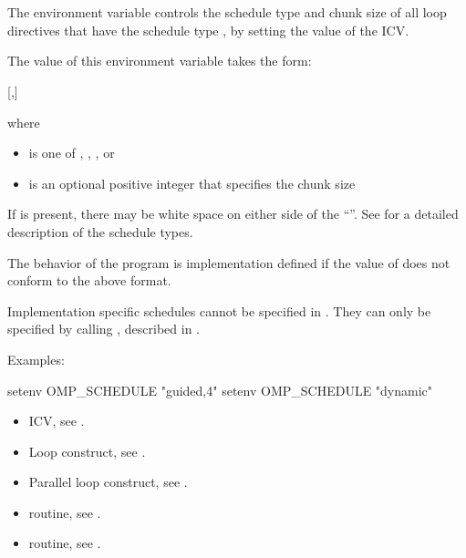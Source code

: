 \section{}
\label{sec:OMP_SCHEDULE}
The  environment variable controls the schedule type and chunk size 
of all loop directives that have the schedule type , by setting the value of the 
 ICV.

The value of this environment variable takes the form:

[,]

where

\begin{itemize}
\item {} is one of , , , or 

\item {} is an optional positive integer that specifies the chunk size
\end{itemize}

If  is present, there may be white space on either side of the ``\code{,}''. See 
 for a detailed description of the schedule types.

The behavior of the program is implementation defined if the value of  
does not conform to the above format.

Implementation specific schedules cannot be specified in . They can 
only be specified by calling , described in . 

Examples:

\begin{boxedcode}
setenv OMP\_SCHEDULE "guided,4" 
setenv OMP\_SCHEDULE "dynamic"
\end{boxedcode}

\crossreferences
\begin{itemize}
\item {} ICV, see .

\item Loop construct, see .

\item Parallel loop construct, see .

\item {} routine, see .

\item {} routine, see .
\end{itemize}









